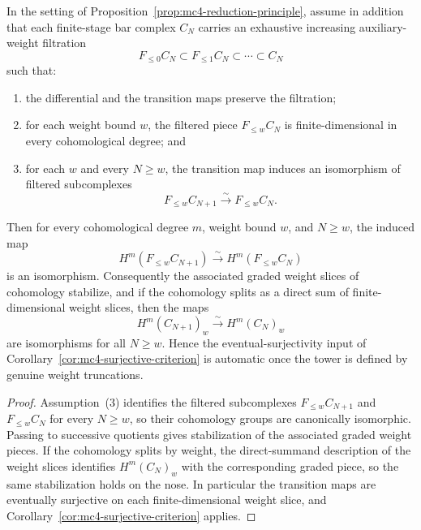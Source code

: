 \begin{proposition}
\label{prop:mc4-weight-cutoff}
In the setting of Proposition~\ref{prop:mc4-reduction-principle},
assume in addition that each finite-stage bar complex $C_N$ carries an
exhaustive increasing auxiliary-weight filtration
\[
F_{\le 0}C_N \subset F_{\le 1}C_N \subset \cdots \subset C_N
\]
such that:
\begin{enumerate}
\item the differential and the transition maps preserve the filtration;
\item for each weight bound $w$, the filtered piece $F_{\le w}C_N$ is
 finite-dimensional in every cohomological degree; and
\item for each $w$ and every $N \ge w$, the transition map induces an
 isomorphism of filtered subcomplexes
 \[
 F_{\le w}C_{N+1} \xrightarrow{\sim} F_{\le w}C_N.
 \]
\end{enumerate}
Then for every cohomological degree $m$, weight bound $w$, and
$N \ge w$, the induced map
\[
H^m(F_{\le w}C_{N+1}) \xrightarrow{\sim} H^m(F_{\le w}C_N)
\]
is an isomorphism. Consequently the associated graded weight slices of
cohomology stabilize, and if the cohomology splits as a direct sum of
finite-dimensional weight slices, then the maps
\[
H^m(C_{N+1})_w \xrightarrow{\sim} H^m(C_N)_w
\]
are isomorphisms for all $N \ge w$. Hence the eventual-surjectivity
input of Corollary~\ref{cor:mc4-surjective-criterion} is automatic once
the tower is defined by genuine weight truncations.
\end{proposition}

\begin{proof}
Assumption~\textup{(3)} identifies the filtered subcomplexes
$F_{\le w}C_{N+1}$ and $F_{\le w}C_N$ for every $N \ge w$, so their
cohomology groups are canonically isomorphic. Passing to successive
quotients gives stabilization of the associated graded weight pieces.
If the cohomology splits by weight, the direct-summand description of
the weight slices identifies $H^m(C_N)_w$ with the corresponding
graded piece, so the same stabilization holds on the nose. In
particular the transition maps are eventually surjective on each
finite-dimensional weight slice, and
Corollary~\ref{cor:mc4-surjective-criterion} applies.
\end{proof}

